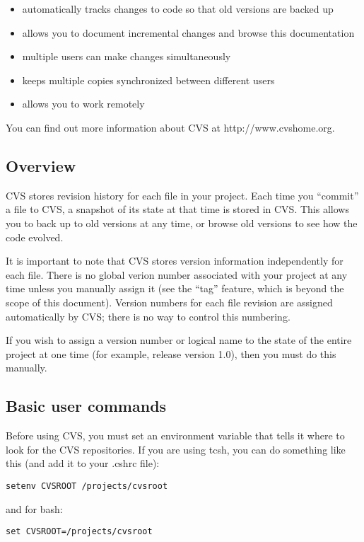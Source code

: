 \documentclass[11pt, letterpaper]{article}
\begin{document}
\begin{itemize}
	\item automatically tracks changes to code so that 
	old versions are backed up
	\item allows you to document incremental changes and browse this
	documentation
	\item multiple users can make changes simultaneously
	\item keeps multiple copies synchronized between
	different users 
	\item allows you to work remotely
\end{itemize}

You can find out more information about CVS at http://www.cvshome.org.  

\subsection{Overview}

CVS stores revision history for each file in your project.  Each time
you ``commit'' a file to CVS, a snapshot of its state at that time is
stored in CVS.  This allows you to back up to old versions at any time,
or browse old versions to see how the code evolved.

It is important to note that CVS stores version information
independently for each file.   
There is no global verion number
associated with your project at any time unless you manually
assign it (see the ``tag'' feature, which is beyond the scope of this
document).  Version numbers for each file revision are assigned automatically by
CVS; there is no way to control this numbering.   

If you wish to assign a version number or logical name to the state of
the entire project at one time (for example, release version 1.0), then
you must do this manually.

\subsection{Basic user commands}

Before using CVS, you must set an environment variable that tells it
where to look for the CVS repositories.  If you are using tcsh, you can
do something like this (and add it to your .cshrc file):
\begin{verbatim}
setenv CVSROOT /projects/cvsroot
\end{verbatim}

and for bash:
\begin{verbatim}
set CVSROOT=/projects/cvsroot
\end{verbatim}
\end{document}
